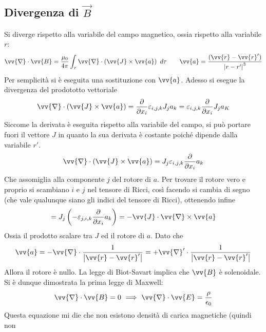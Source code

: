 \documentclass[a4paper, oneside]{article}
\begin{document}
\subsection{Divergenza di $\vec{B}$ }
Si diverge rispetto alla variabile del campo magnetico, ossia 
rispetto alla variabile $r$:
\begin{gather*}
    \vv{\nabla} \cdot \vv{B} = \frac{\mu_0}{4\pi}  \int_{\tau}^{} \vv{\nabla} \cdot \left(\vv{J} \times \vv{a}  \right) \ d\tau \qquad \vv{a} = \frac{(\vv{r} - \vv{r}'  )}{\left| r - r' \right|^{3} }  
\end{gather*}
Per semplicità si è eseguita una sostituzione con $\vv{a}$. Adesso si esegue la divergenza
del prodototto vettoriale
\begin{gather*}
    \vv{\nabla} \cdot (\vv{J} \times \vv{a}  ) = \frac{\partial }{\partial x_i} \varepsilon_{i, j, k} J_ja_k  = \varepsilon_{i, j, k} \frac{\partial }{\partial x_i}  J_j a_K
\end{gather*} 
Siccome la derivata è eseguita rispetto alla variabile del campo, si può portare fuori il vettore
$J$ in quanto la sua derivata è costante poiché dipende dalla variabile $r'$.
\begin{gather*}
    \vv{\nabla} \cdot  (\vv{J} \times \vv{a}  ) = J_j \varepsilon_{i, j, k} \frac{\partial }{\partial x_i} a_k  
\end{gather*}
Che assomiglia alla componente $j$ del rotore di $a$. Per trovare il rotore vero e proprio 
si scambiano $i$ e $j$ nel tensore di Ricci, così facendo si cambia di segno (che vale qualunque 
siano gli indici del tensore di Ricci), ottenendo infine
\begin{gather*}
    = J_j\left(-\varepsilon_{j, i, k} \frac{\partial }{\partial x_i} a_{k} \right) = -\vv{J} \cdot \vv{\nabla} \times \vv{a}   
\end{gather*}
Ossia il prodotto scalare tra $J$ ed il rotore di $a$. Dato che
\begin{gather*}
    \vv{a} = -\vv{\nabla} \cdot \frac{1}{\left| \vv{r} - \vv{r}'   \right| }  = + \vv{\nabla}' \cdot \frac{1}{\left| \vv{r} -\vv{r}'   \right| } 
\end{gather*} 
Allora il rotore è nullo. La legge di Biot-Savart implica che $\vv{B}$ è solenoidale. Si è dunque dimostrata la prima 
legge di Maxwell:
\begin{gather*}
    \vv{\nabla} \cdot \vv{B} = 0 \ \Longrightarrow \ \vv{\nabla}\cdot \vv{E} = \frac{\rho}{\epsilon_0}    
\end{gather*} 
Questa equazione mi die che non esistono densità di carica magnetiche (quindi non 
\end{document}
